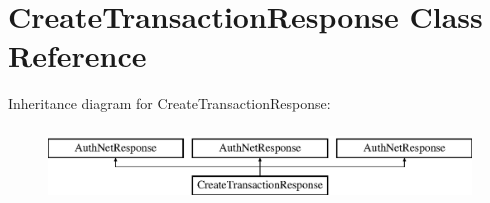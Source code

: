 \hypertarget{interface_create_transaction_response}{
\section{CreateTransactionResponse Class Reference}
\label{interface_create_transaction_response}
}
Inheritance diagram for CreateTransactionResponse:\begin{figure}[H]
\begin{center}
\leavevmode
\includegraphics[height=2.000000cm]{interface_create_transaction_response}
\end{center}
\end{figure}

